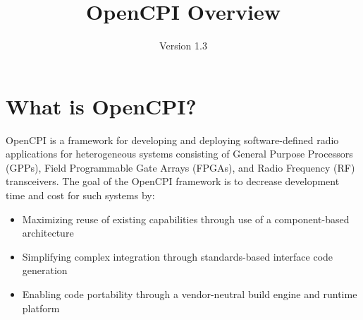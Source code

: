 \def\docTitle{OpenCPI Overview}
\def\docVersion{1.3}

\setlength{\parindent}{0pt} %
\newcommand{\forceindent}{\leavevmode{\parindent=1em\indent}}
\date{Version \docVersion} %
\title{\docTitle}
\lhead{\small {\docTitle} }
\def\bstart{~\\
\begin{minipage}{\linewidth}}
\def\bend{\end{minipage}
~\\
}

\section*{What is OpenCPI?}
\label{sec:what_is_opencpi}
OpenCPI is a framework for developing and deploying software-defined radio applications for heterogeneous systems consisting of General Purpose Processors (GPPs), Field Programmable Gate Arrays (FPGAs), and Radio Frequency (RF) transceivers. The goal of the OpenCPI framework is to decrease development time and cost for such systems by:
\begin{itemize}
\item Maximizing reuse of existing capabilities through use of a component-based architecture
\item Simplifying complex integration through standards-based interface code generation
\item Enabling code portability through a vendor-neutral build engine and runtime platform
\end{itemize}

